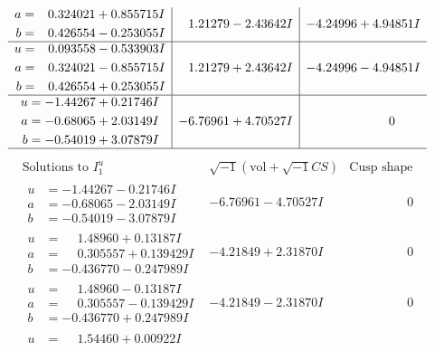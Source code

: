 \documentclass[1p]{elsarticle_modified}
\theoremstyle{definition}
\newcommand{\I}{\sqrt{-1}}
\begin{document}
$$\begin{array}{c|c|c}
\begin{aligned}
a &= \phantom{-}0.324021 + 0.855715 I \\
b &= \phantom{-}0.426554 - 0.253055 I\end{aligned}
 & \phantom{-}1.21279 - 2.43642 I & -4.24996 + 4.94851 I \\ \hline\begin{aligned}
u &= \phantom{-}0.093558 - 0.533903 I \\
a &= \phantom{-}0.324021 - 0.855715 I \\
b &= \phantom{-}0.426554 + 0.253055 I\end{aligned}
 & \phantom{-}1.21279 + 2.43642 I & -4.24996 - 4.94851 I \\ \hline\begin{aligned}
u &= -1.44267 + 0.21746 I \\
a &= -0.68065 + 2.03149 I \\
b &= -0.54019 + 3.07879 I\end{aligned}
 & -6.76961 + 4.70527 I & \phantom{-0.000000 } 0\\
 \hline 
 \end{array}$$\newpage$$\begin{array}{c|c|c}  
\text{Solutions to }I^u_{1}& \I (\text{vol} + \sqrt{-1}CS) & \text{Cusp shape}\\
 \hline 
\begin{aligned}
u &= -1.44267 - 0.21746 I \\
a &= -0.68065 - 2.03149 I \\
b &= -0.54019 - 3.07879 I\end{aligned}
 & -6.76961 - 4.70527 I & \phantom{-0.000000 } 0 \\ \hline\begin{aligned}
u &= \phantom{-}1.48960 + 0.13187 I \\
a &= \phantom{-}0.305557 + 0.139429 I \\
b &= -0.436770 - 0.247989 I\end{aligned}
 & -4.21849 + 2.31870 I & \phantom{-0.000000 } 0 \\ \hline\begin{aligned}
u &= \phantom{-}1.48960 - 0.13187 I \\
a &= \phantom{-}0.305557 - 0.139429 I \\
b &= -0.436770 + 0.247989 I\end{aligned}
 & -4.21849 - 2.31870 I & \phantom{-0.000000 } 0 \\ \hline\begin{aligned}
u &= \phantom{-}1.54460 + 0.00922 I \\

\end{aligned}
\end{array}$$
\end{document}
